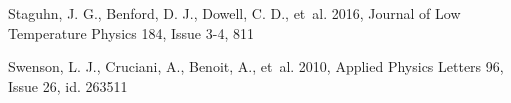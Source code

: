 \begin{thebibliography}{99}
Staguhn, J. G., Benford, D. J., Dowell, C. D., {et~al.} 2016,
Journal of Low Temperature Physics 184, Issue 3-4, 811

Swenson, L. J., Cruciani, A., Benoit, A., {et~al.} 2010, 
Applied Physics Letters 96, Issue 26, id. 263511

  
  




\end{thebibliography}
